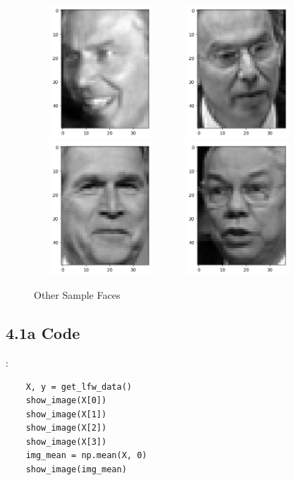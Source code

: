 \documentclass[10pt]{article}
\begin{document}
\begin{figure}[H]
  \centering
  \includegraphics[width=5cm, height=5cm]{images/4.1a_face1.png}
  \includegraphics[width=5cm, height=5cm]{images/4.1a_face2.png}
  \includegraphics[width=5cm, height=5cm]{images/4.1a_face3.png}
  \includegraphics[width=5cm, height=5cm]{images/4.1a_face4.png}
  \caption{Other Sample Faces}
  \label{fig:sample-faces}
\end{figure}

\subsection*{4.1a Code}:
\begin{verbatim}
    X, y = get_lfw_data()
    show_image(X[0])
    show_image(X[1])
    show_image(X[2])
    show_image(X[3])
    img_mean = np.mean(X, 0)
    show_image(img_mean)
\end{verbatim} 
\end{document}
